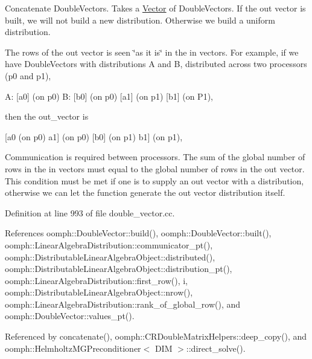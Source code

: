 Concatenate Double\+Vectors. Takes a \hyperlink{classoomph_1_1Vector}{Vector} of Double\+Vectors. If the out vector is built, we will not build a new distribution. Otherwise we build a uniform distribution. 

The rows of the out vector is seen \char`\"{}as it is\char`\"{} in the in vectors. For example, if we have Double\+Vectors with distributions A and B, distributed across two processors (p0 and p1),

A\+: \mbox{[}a0\mbox{]} (on p0) B\+: \mbox{[}b0\mbox{]} (on p0) \mbox{[}a1\mbox{]} (on p1) \mbox{[}b1\mbox{]} (on P1),

then the out\+\_\+vector is

\mbox{[}a0 (on p0) a1\mbox{]} (on p0) \mbox{[}b0\mbox{]} (on p1) b1\mbox{]} (on p1),

Communication is required between processors. The sum of the global number of rows in the in vectors must equal to the global number of rows in the out vector. This condition must be met if one is to supply an out vector with a distribution, otherwise we can let the function generate the out vector distribution itself. 

Definition at line 993 of file double\+\_\+vector.\+cc.



References oomph\+::\+Double\+Vector\+::build(), oomph\+::\+Double\+Vector\+::built(), oomph\+::\+Linear\+Algebra\+Distribution\+::communicator\+\_\+pt(), oomph\+::\+Distributable\+Linear\+Algebra\+Object\+::distributed(), oomph\+::\+Distributable\+Linear\+Algebra\+Object\+::distribution\+\_\+pt(), oomph\+::\+Linear\+Algebra\+Distribution\+::first\+\_\+row(), i, oomph\+::\+Distributable\+Linear\+Algebra\+Object\+::nrow(), oomph\+::\+Linear\+Algebra\+Distribution\+::rank\+\_\+of\+\_\+global\+\_\+row(), and oomph\+::\+Double\+Vector\+::values\+\_\+pt().



Referenced by concatenate(), oomph\+::\+C\+R\+Double\+Matrix\+Helpers\+::deep\+\_\+copy(), and oomph\+::\+Helmholtz\+M\+G\+Preconditioner$<$ D\+I\+M $>$\+::direct\+\_\+solve().

\mbox{\label{namespaceoomph_1_1DoubleVectorHelpers_ae2e2b5728675ea85a48158f5d93f6593}} 
